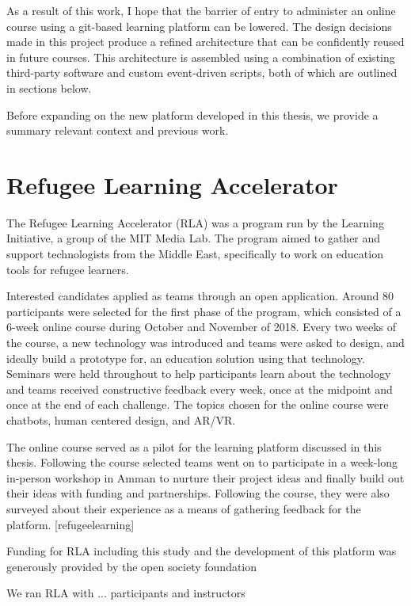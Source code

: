 \documentclass[12pt,twoside,vi]{mitthesis}
\newcommand{\wip}[1]{{\color{red} #1}}
\begin{document}
As a result of this work, I hope that the barrier of entry to administer an online course using a git-based learning platform can be lowered. The design decisions made in this project produce a refined architecture that can be confidently reused in future courses. This architecture is assembled using a combination of existing third-party software and custom event-driven scripts, both of which are outlined in sections below.

Before expanding on the new platform developed in this thesis, we provide a summary relevant context and previous work.

\section{Refugee Learning Accelerator}

The Refugee Learning Accelerator (RLA) was a program run by the Learning Initiative, a group of the MIT Media Lab. The program aimed to gather and support technologists from the Middle East, specifically to work on education tools for refugee learners. 

Interested candidates applied as teams through an open application. Around 80 participants were selected for the first phase of the program, which consisted of a 6-week online course during October and November of 2018. Every two weeks of the course, a new technology was introduced and teams were asked to design, and ideally build a prototype for, an education solution using that technology. Seminars were held throughout to help participants learn about the technology and teams received constructive feedback every week, once at the midpoint and once at the end of each challenge. The topics chosen for the online course were chatbots, human centered design, and AR/VR.

The online course served as a pilot for the learning platform discussed in this thesis. Following the course selected teams went on to participate in a week-long in-person workshop in Amman to nurture their project ideas and finally build out their ideas with funding and partnerships. Following the course, they were also surveyed about their experience as a means of gathering feedback for the platform. [refugeelearning]

\wip{Funding for RLA including this study and the development of this platform was generously provided by the open society foundation}

We ran RLA with ... participants and instructors
\end{document}
